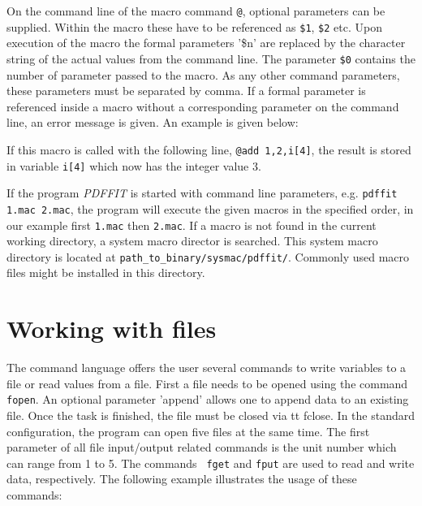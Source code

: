 On the command line of the macro command {\tt @}, optional
parameters can be supplied.  Within the macro these have to be
referenced as {\tt \$1}, {\tt \$2} etc.  Upon execution of the macro
the formal parameters '\$n' are replaced by the character string of
the actual values from the command line. The parameter {\tt \$0}
contains the number of parameter passed to the macro. As any other
command parameters, these parameters must be separated by comma.  If
a formal parameter is referenced inside a macro without a
corresponding parameter on the command line, an error message is
given.  An example is given below:


If this macro is called with the following line, {\tt @add
1,2,i[4]}, the result is stored in variable {\tt i[4]} which now
has the integer value 3. \par

If the program {\it PDFFIT} is started with command line parameters,
e.g. {\tt pdffit 1.mac 2.mac}, the program will execute the given
macros in the specified order, in our example first {\tt 1.mac} then
{\tt 2.mac}. If a macro is not found in the current working
directory, a system macro director is searched. This system macro
directory is located at {\tt path\_to\_binary/sysmac/pdffit/}.
Commonly used macro files might be installed in this directory.


\section{Working with files \label{io}}

The command language offers the user several commands to write
variables to a file or read values from a file. First a file needs
to be opened using the command {\tt fopen}. An optional parameter
'append' allows one to append data to an existing file. Once the
task is finished, the file must be closed via {tt fclose}. In the
standard configuration, the program can open five files at the same
time. The first parameter of all file input/output related commands
is the unit number which can range from 1 to 5. The commands {\tt
fget} and {\tt fput} are used to read and write data, respectively.
The following example illustrates the usage of these commands:

